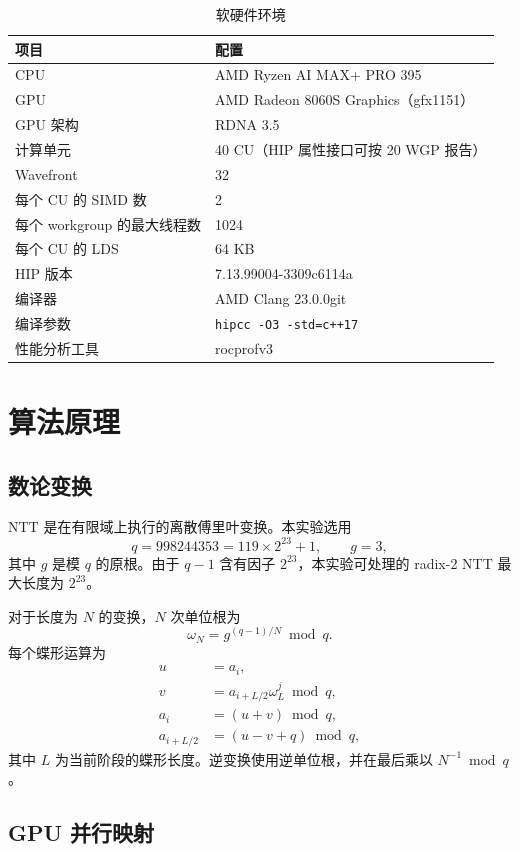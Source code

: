 ﻿\documentclass[a4paper]{article}
\begin{document}
\begin{table}[H]
  \centering
  \caption{软硬件环境}
  \begin{tabular}{ll}
    \toprule
    项目 & 配置 \\
    \midrule
    CPU & AMD Ryzen AI MAX+ PRO 395 \\
    GPU & AMD Radeon 8060S Graphics（gfx1151）\\
    GPU 架构 & RDNA 3.5 \\
    计算单元 & 40 CU（HIP 属性接口可按 20 WGP 报告）\\
    Wavefront & 32 \\
    每个 CU 的 SIMD 数 & 2 \\
    每个 workgroup 的最大线程数 & 1024 \\
    每个 CU 的 LDS & 64 KB \\
    HIP 版本 & 7.13.99004-3309c6114a \\
    编译器 & AMD Clang 23.0.0git \\
    编译参数 & \texttt{hipcc -O3 -std=c++17} \\
    性能分析工具 & rocprofv3 \\
    \bottomrule
  \end{tabular}
\end{table}

\section{算法原理}

\subsection{数论变换}

NTT 是在有限域上执行的离散傅里叶变换。本实验选用
\[
q=998244353=119\times 2^{23}+1,
\qquad g=3,
\]
其中 $g$ 是模 $q$ 的原根。由于 $q-1$ 含有因子 $2^{23}$，本实验可处理的
radix-2 NTT 最大长度为 $2^{23}$。

对于长度为 $N$ 的变换，$N$ 次单位根为
\[
\omega_N=g^{(q-1)/N}\bmod q.
\]
每个蝶形运算为
\begin{align}
u &= a_i,\\
v &= a_{i+L/2}\omega_L^j \bmod q,\\
a_i &= (u+v)\bmod q,\\
a_{i+L/2} &= (u-v+q)\bmod q,
\end{align}
其中 $L$ 为当前阶段的蝶形长度。逆变换使用逆单位根，并在最后乘以
$N^{-1}\bmod q$。

\subsection{GPU 并行映射}
\end{document}
